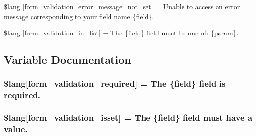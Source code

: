 \begin{DoxyCompactItemize}
\item 
\hyperlink{_admin_2system_2language_2english_2form__validation__lang_8php_ad29f9046f70e4b900cf5283143de0618}{\$lang} \mbox{[}\textquotesingle{}form\+\_\+validation\+\_\+error\+\_\+message\+\_\+not\+\_\+set\textquotesingle{}\mbox{]} = \textquotesingle{}Unable to access an error message corresponding to your field name \{field\}.\textquotesingle{}
\item 
\hyperlink{_admin_2system_2language_2english_2form__validation__lang_8php_ae48fb4c900d50c05f0939f9fec1262a2}{\$lang} \mbox{[}\textquotesingle{}form\+\_\+validation\+\_\+in\+\_\+list\textquotesingle{}\mbox{]} = \textquotesingle{}The \{field\} field must be one of\+: \{param\}.\textquotesingle{}
\end{DoxyCompactItemize}


\subsection{Variable Documentation}
\hypertarget{_admin_2system_2language_2english_2form__validation__lang_8php_a2335c24e2213207c5dda58ec093673a9}{}
\subsubsection[{\$lang}]{\setlength{\rightskip}{0pt plus 5cm}\$lang\mbox{[}\textquotesingle{}form\+\_\+validation\+\_\+required\textquotesingle{}\mbox{]} = \textquotesingle{}The \{field\} field is required.\textquotesingle{}}\label{_admin_2system_2language_2english_2form__validation__lang_8php_a2335c24e2213207c5dda58ec093673a9}
\hypertarget{_admin_2system_2language_2english_2form__validation__lang_8php_a941575e651258a5a17341aca4e587898}{}
\subsubsection[{\$lang}]{\setlength{\rightskip}{0pt plus 5cm}\$lang\mbox{[}\textquotesingle{}form\+\_\+validation\+\_\+isset\textquotesingle{}\mbox{]} = \textquotesingle{}The \{field\} field must have {\bf a} value.\textquotesingle{}}\label{_admin_2system_2language_2english_2form__validation__lang_8php_a941575e651258a5a17341aca4e587898}
\hypertarget{_admin_2system_2language_2english_2form__validation__lang_8php_a652d5be4d397dcac4407294c2436af34}{}
